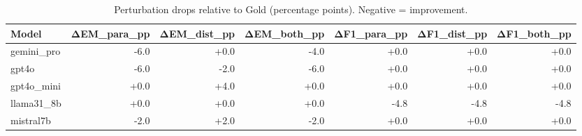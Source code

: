 \begin{table}[t]\centering
\caption{Perturbation drops relative to Gold (percentage points). Negative = improvement.}
\label{tab:drops}
\begin{tabular}{lrrrrrr}
\toprule
Model & ΔEM_para_pp & ΔEM_dist_pp & ΔEM_both_pp & ΔF1_para_pp & ΔF1_dist_pp & ΔF1_both_pp \\
\midrule
gemini_pro & -6.0 & +0.0 & -4.0 & +0.0 & +0.0 & +0.0 \\
gpt4o & -6.0 & -2.0 & -6.0 & +0.0 & +0.0 & +0.0 \\
gpt4o_mini & +0.0 & +4.0 & +0.0 & +0.0 & +0.0 & +0.0 \\
llama31_8b & +0.0 & +0.0 & +0.0 & -4.8 & -4.8 & -4.8 \\
mistral7b & -2.0 & +2.0 & -2.0 & +0.0 & +0.0 & +0.0 \\
\bottomrule
\end{tabular}
\end{table}
